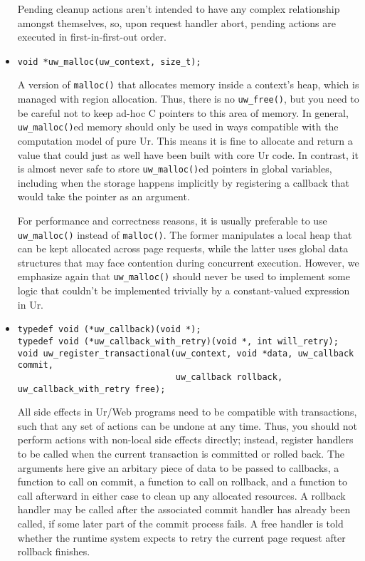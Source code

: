 \documentclass{article}
\begin{document}
\begin{itemize}
  Pending cleanup actions aren't intended to have any complex relationship amongst themselves, so, upon request handler abort, pending actions are executed in first-in-first-out order.

  \item \begin{verbatim}
void *uw_malloc(uw_context, size_t);
  \end{verbatim}
  A version of \texttt{malloc()} that allocates memory inside a context's heap, which is managed with region allocation.  Thus, there is no \texttt{uw\_free()}, but you need to be careful not to keep ad-hoc C pointers to this area of memory.  In general, \texttt{uw\_malloc()}ed memory should only be used in ways compatible with the computation model of pure Ur.  This means it is fine to allocate and return a value that could just as well have been built with core Ur code.  In contrast, it is almost never safe to store \texttt{uw\_malloc()}ed pointers in global variables, including when the storage happens implicitly by registering a callback that would take the pointer as an argument.

  For performance and correctness reasons, it is usually preferable to use \texttt{uw\_malloc()} instead of \texttt{malloc()}.  The former manipulates a local heap that can be kept allocated across page requests, while the latter uses global data structures that may face contention during concurrent execution.  However, we emphasize again that \texttt{uw\_malloc()} should never be used to implement some logic that couldn't be implemented trivially by a constant-valued expression in Ur.

  \item \begin{verbatim}
typedef void (*uw_callback)(void *);
typedef void (*uw_callback_with_retry)(void *, int will_retry);
void uw_register_transactional(uw_context, void *data, uw_callback commit,
                               uw_callback rollback, uw_callback_with_retry free);
  \end{verbatim}
  All side effects in Ur/Web programs need to be compatible with transactions, such that any set of actions can be undone at any time.  Thus, you should not perform actions with non-local side effects directly; instead, register handlers to be called when the current transaction is committed or rolled back.  The arguments here give an arbitary piece of data to be passed to callbacks, a function to call on commit, a function to call on rollback, and a function to call afterward in either case to clean up any allocated resources.  A rollback handler may be called after the associated commit handler has already been called, if some later part of the commit process fails.  A free handler is told whether the runtime system expects to retry the current page request after rollback finishes.


\end{itemize}
\end{document}
